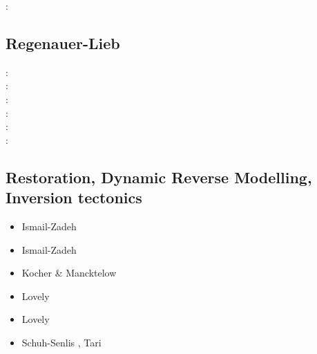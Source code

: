 \begin{scriptsize}
\twothousandthirteen: \cite{orwa13}
\end{scriptsize}

\subsection{Regenauer-Lieb}

{\scriptsize
\twothousand: \cite{reyu00}\\
\twothousandthree: \cite{reyu03}\\
\twothousandfour: \cite{reyu04}\\
\twothousandsix: \cite{rehy06}\cite{rewr06}\\
\twothousandnine: \cite{reps09}\\
\twothousandthirteen: \cite{revp13}
}

\subsection{Restoration, Dynamic Reverse Modelling, Inversion tectonics}

\begin{scriptsize}
\begin{itemize}
\item[\twothousandone] Ismail-Zadeh \etal \cite{istv01}
\item[\twothousandfour] Ismail-Zadeh \etal \cite{istt04}
\item[\twothousandfive] Kocher \& Mancktelow \cite{koma05}
\item[\twothousandtwelve] Lovely \etal \cite{lofg12}
\item[\twothousandeighteen] Lovely \etal \cite{lojm18}
\item[\twothousandtwenty] Schuh-Senlis \etal \cite{sctc20}, Tari \etal \cite{taas20}
\end{itemize}
\end{scriptsize}


